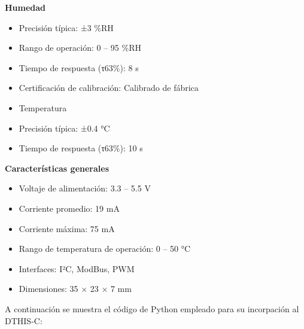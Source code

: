 \documentclass[
  letterpaper,
]{scrbook}
\providecommand{\tightlist}{%
  \setlength{\itemsep}{0pt}\setlength{\parskip}{0pt}}\usepackage{longtable,booktabs,array}
\begin{document}
\textbf{Humedad}

\begin{itemize}
\tightlist
\item
  Precisión típica: ±3 \%RH
\item
  Rango de operación: 0 -- 95 \%RH
\item
  Tiempo de respuesta (τ63\%): 8 s
\item
  Certificación de calibración: Calibrado de fábrica
\item
  Temperatura
\item
  Precisión típica: ±0.4 °C
\item
  Tiempo de respuesta (τ63\%): 10 s
\end{itemize}

\textbf{Características generales}

\begin{itemize}
\tightlist
\item
  Voltaje de alimentación: 3.3 -- 5.5 V
\item
  Corriente promedio: 19 mA
\item
  Corriente máxima: 75 mA
\item
  Rango de temperatura de operación: 0 -- 50 °C
\item
  Interfaces: I²C, ModBus, PWM
\item
  Dimensiones: 35 × 23 × 7 mm
\end{itemize}

A continuación se muestra el código de Python empleado para su
incorpación al DTHIS-C:
\end{document}
